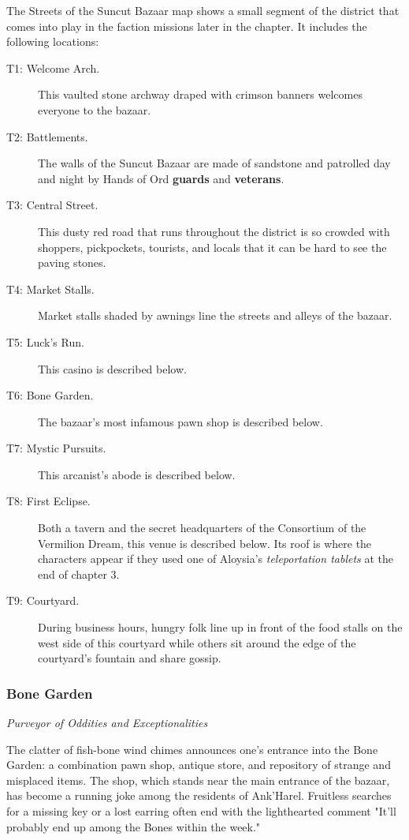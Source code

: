 \documentclass[letterpaper, 11pt, bg=full, twocolumn]{dndbook}
\begin{document}

The Streets of the Suncut Bazaar map shows a small segment of the district that comes into play in the faction missions later in the chapter. It includes the following locations:

\begin{description}
\item[T1: Welcome Arch.] This vaulted stone archway draped with crimson banners welcomes everyone to the bazaar.
\item[T2: Battlements.] The walls of the Suncut Bazaar are made of sandstone and patrolled day and night by Hands of Ord \textbf{guards} and \textbf{veterans}.
\item[T3: Central Street.] This dusty red road that runs throughout the district is so crowded with shoppers, pickpockets, tourists, and locals that it can be hard to see the paving stones.
\item[T4: Market Stalls.] Market stalls shaded by awnings line the streets and alleys of the bazaar.
\item[T5: Luck's Run.] This casino is described below.
\item[T6: Bone Garden.] The bazaar's most infamous pawn shop is described below.
\item[T7: Mystic Pursuits.] This arcanist's abode is described below.
\item[T8: First Eclipse.] Both a tavern and the secret headquarters of the Consortium of the Vermilion Dream, this venue is described below. Its roof is where the characters appear if they used one of Aloysia's \textit{teleportation tablets} at the end of chapter 3.
\item[T9: Courtyard.] During business hours, hungry folk line up in front of the food stalls on the west side of this courtyard while others sit around the edge of the courtyard's fountain and share gossip.
\end{description}



\subsubsection{Bone Garden}

\textit{Purveyor of Oddities and Exceptionalities}

The clatter of fish-bone wind chimes announces one's entrance into the Bone Garden: a combination pawn shop, antique store, and repository of strange and misplaced items. The shop, which stands near the main entrance of the bazaar, has become a running joke among the residents of Ank'Harel. Fruitless searches for a missing key or a lost earring often end with the lighthearted comment "It'll probably end up among the Bones within the week."
\end{document}
